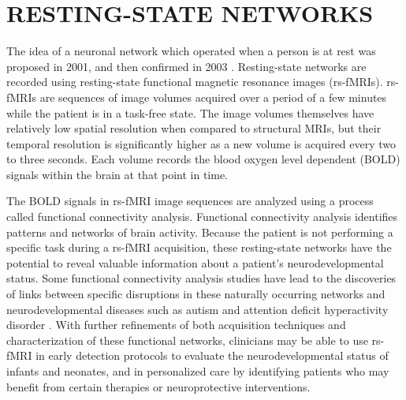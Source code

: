 \section{RESTING-STATE NETWORKS}

The idea of a neuronal network which operated when a person is at rest was proposed in 2001, and then confirmed in 2003 \cite{Raichle2001} \cite{Greicius2003}. Resting-state networks are recorded using resting-state functional magnetic resonance images (rs-fMRIs). rs-fMRIs are sequences of image volumes acquired over a period of a few minutes while the patient is in a task-free state. The image volumes themselves have relatively low spatial resolution when compared to structural MRIs, but their temporal resolution is significantly higher as a new volume is acquired every two to three seconds. Each volume records the blood oxygen level dependent (BOLD) signals within the brain at that point in time. 

The BOLD signals in rs-fMRI image sequences are analyzed using a process called functional connectivity analysis. Functional connectivity analysis identifies patterns and networks of brain activity. Because the patient is not performing a specific task during a rs-fMRI acquisition, these resting-state networks have the potential to reveal valuable information about a patient's neurodevelopmental status. Some functional connectivity analysis studies have lead to the discoveries of links between specific disruptions in these naturally occurring networks and neurodevelopmental diseases such as autism and attention deficit hyperactivity disorder \cite{Assaf2010} \cite{Zang2007}. With further refinements of both acquisition techniques and characterization of these functional networks, clinicians may be able to use rs-fMRI in early detection protocols to evaluate the neurodevelopmental status of infants and neonates, and in personalized care by identifying patients who may benefit from certain therapies or neuroprotective interventions.
